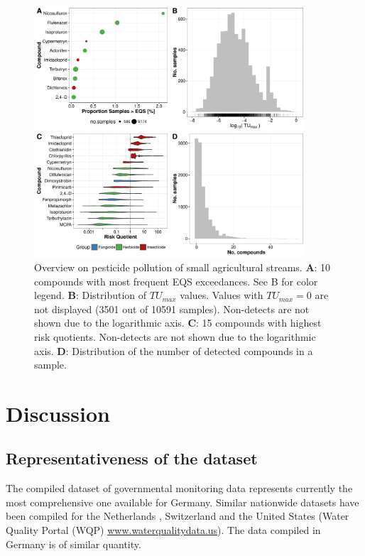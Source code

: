 \documentclass[journal=esthag,manuscript=article]{achemso}
\begin{document}
\begin{figure}[h]
  \includegraphics[width=0.9\textwidth]{figure5.pdf}
  \caption{Overview on pesticide pollution of small agricultural streams. 
      \textbf{A}: 10 compounds with most frequent EQS exceedances. See B for color legend.
      \textbf{B}: Distribution of $TU_{max}$ values. Values with $TU_{max} = 0$ are not displayed (3501 out of 10591 samples). Non-detects are not shown due to the logarithmic axis.
      \textbf{C}: 15 compounds with highest risk quotients. Non-detects are not shown due to the logarithmic axis.
      \textbf{D}: Distribution of the number of detected compounds in a sample.
  }
  \label{fig:fig5}
\end{figure}



\section{Discussion}
\subsection{Representativeness of the dataset}
The compiled dataset of governmental monitoring data represents currently the most comprehensive one available for Germany.
Similar nationwide datasets have been compiled for the Netherlands \citep{vijver_spatial_2008}, Switzerland \citep{munz_pestizidmessungen_2011} and the United States (Water Quality Portal (WQP) \url{www.waterqualitydata.us}).
The data compiled in Germany is of similar quantity.
\end{document}
